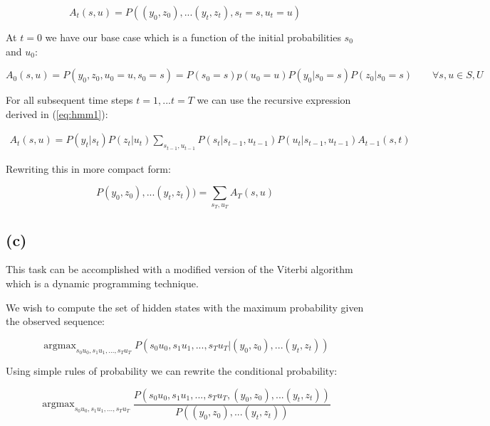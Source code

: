 \documentclass[11pt]{amsart}
\DeclareMathOperator*{\argmax}{argmax}
\begin{document}
\begin{equation}
A_{t}(s,u) = P((y_0, z_0),...(y_t, z_t), s_t=s, u_t=u)
\end{equation}

At $t=0$ we have our base case which is a function of the initial probabilities $s_0$ and $u_0$:

\begin{equation}
A_{0}(s,u) = P(y_0, z_0, u_0=u, s_0=s) = P(s_0 =s )p(u_0 = u) P(y_0 \vert s_0 = s)P(z_0 \vert s_0=s) \qquad \forall s,u \in S, U
\end{equation}

For all subsequent time steps $t=1,... t=T$ we can use the recursive expression derived in (\ref{eq:hmm1}):

\begin{equation}
\begin{aligned}
A_t(s,u) = P(y_t \vert s_t) P(z_t \vert u_t) \sum_{s_{t-1}, u_{t-1}} P(s_t \vert s_{t-1}, u_{t-1}) P(u_t \vert s_{t-1}, u_{t-1}) A_{t-1}(s, t)
\end{aligned}
\end{equation}

Rewriting this in more compact form:

\begin{equation}
P(y_0, z_0),...(y_t, z_t)) = \sum_{s_T, u_T} A_{T}(s,u)
\end{equation}

\subsection{(c)}

This task can be accomplished with a modified version of the Viterbi algorithm which is a dynamic programming technique.

We wish to compute the set of hidden states with the maximum probability given the observed sequence:

\begin{equation}
\argmax_{s_0 u_0, s_1 u_1, ..., s_T u_T} P(s_0 u_0, s_1 u_1, ..., s_T u_T \vert (y_0, z_0),...(y_t, z_t))
\end{equation}

Using simple rules of probability we can rewrite the conditional probability:

\begin{equation}
\argmax_{s_0 u_0, s_1 u_1, ..., s_T u_T} \frac{P(s_0 u_0, s_1 u_1, ..., s_T u_T, (y_0, z_0),...(y_t, z_t))}{P((y_0, z_0),...(y_t, z_t))}
\end{equation}
\end{document}
